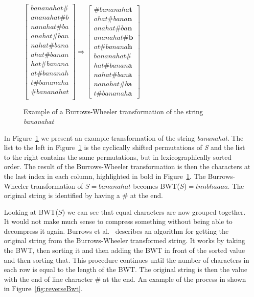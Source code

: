\begin{figure}
\begin{center}
$\begin{bmatrix}
	bananahat\#\\
	ananahat\#b\\
	nanahat\#ba\\
	anahat\#ban\\
	nahat\#bana\\
	ahat\#banan\\
	hat\#banana\\
	at\#bananah\\
	t\#bananaha\\
	\#bananahat\\
\end{bmatrix} \Rightarrow
\begin{bmatrix}
	\#bananaha\textbf{t}\\
	ahat\#bana\textbf{n}\\
	anahat\#ba\textbf{n}\\
	ananahat\#\textbf{b}\\
	at\#banana\textbf{h}\\
	bananahat\#\\
	hat\#banan\textbf{a}\\
	nahat\#ban\textbf{a}\\
	nanahat\#b\textbf{a}\\
	t\#bananah\textbf{a}
\end{bmatrix}$
\end{center}
\caption{Example of a Burrows-Wheeler transformation of the string \textit{bananahat}}
\label{fig:BWTExample}
\end{figure}
In Figure~\ref{fig:BWTExample} we present an example transformation of the string \textit{bananahat}.
The list to the left in Figure~\ref{fig:BWTExample} is the cyclically shifted permutations of \textit{S} and the list to the right contains the same permutations, but in lexicographically sorted order.
The result of the Burrows-Wheeler transformation is then the characters at the last index in each column, highlighted in bold in Figure~\ref{fig:BWTExample}.
The Burrows-Wheeler transformation of $S=bananahat$ becomes BWT($S$)$ = tnnbhaaaa$.
The original string is identified by having a \# at the end.

Looking at BWT($S$) we can see that equal characters are now grouped together.
It would not make much sense to compress something without being able to decompress it again.
Burrows et al.~ describes an algorithm for getting the original string from the Burrows-Wheeler transformed string.
It works by taking the BWT, then sorting it and then adding the BWT in front of the sorted value and then sorting that. 
This procedure continues until the number of characters in each row is equal to the length of the BWT. 
The original string is then the value with the end of line character \# at the end. 
An example of the process in shown in Figure~\ref{fig:reverseBwt}.

